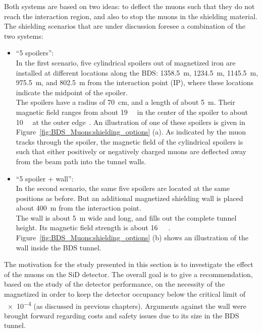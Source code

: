 Both systems are based on two ideas: to deflect the muons such that they do not reach the interaction region, and also to stop the muons in the shielding material.
The shielding scenarios that are under discussion foresee a combination of the two systems:
\begin{itemize}
 \item ``5 spoilers'':\\
 In the first scenario, five cylindrical spoilers out of magnetized iron are installed at different locations along the BDS: \SI{1358.5}{\metre}, \SI{1234.5}{\metre}, \SI{1145.5}{\metre}, \SI{975.5}{\metre}, and \SI{802.5}{\metre} from the interaction point (IP), where these locations indicate the midpoint of the spoiler.
 \\The spoilers have a radius of \SI{70}{\centi\meter}, and a length of about \SI{5}{\meter}.
 Their magnetic field ranges from about \SI{19}{\kilo\gauss} in the center of the spoiler to about \SI{10}{\kilo\gauss} at the outer edge~\cite{MuonShielding,Lewis}.
 An illustration of one of these spoilers is given in Figure~\ref{fig:BDS_Muons:shielding_options} (a).
 As indicated by the muon tracks through the spoiler, the magnetic field of the cylindrical spoilers is such that either positively or negatively charged muons are deflected away from the beam path into the tunnel walls.
 \item ``5 spoiler + wall'':\\
 In the second scenario, the same five spoilers are located at the same positions as before.
 But an additional magnetized shielding wall is placed about \SI{400}{\meter} from the interaction point.
 \\The wall is about \SI{5}{\meter} wide and long, and fills out the complete tunnel height.
 Its magnetic field strength is about \SI{16}{\kilo\gauss}~\cite{MuonShielding,Lewis}.
 Figure~\ref{fig:BDS_Muons:shielding_options} (b) shows an illustration of the wall inside the BDS tunnel.
\end{itemize}
The motivation for the study presented in this section is to investigate the effect of the muons on the SiD detector.
The overall goal is to give a recommendation, based on the study of the detector performance, on the necessity of the magnetized in order to keep the detector occupancy below the critical limit of \num{e-4} (as discussed in previous chapters).
Arguments against the wall were brought forward regarding costs and safety issues due to its size in the BDS tunnel.
